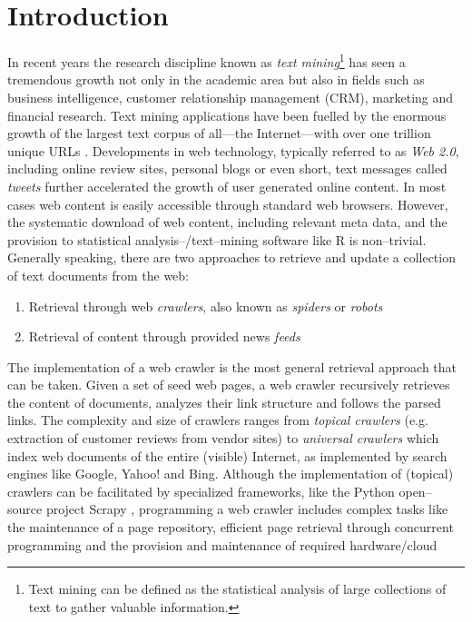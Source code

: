 \documentclass[a4paper]{article}
\newcommand{\pkg}[1]{{\normalfont\fontseries{b}\selectfont #1}}
\newcommand{\proglang}[1]{\textsf{#1}}
\begin{document}
\section{Introduction}
In recent years the research discipline known as \textit{text mining}\footnote{Text
mining can be defined as the statistical analysis of large collections of text
to gather valuable information.} has seen a tremendous growth not only in the
academic area but also in fields such as business intelligence, customer
relationship management (CRM), marketing and financial research. Text mining
applications have been fuelled by the enormous growth of the largest text
corpus of all---the Internet---with over one trillion unique URLs \citep{AlpertHajaj:GoogleBigWeb}.
Developments in web technology, typically referred to as \textit{Web 2.0},
including online review sites, personal blogs or even short, text messages
called \textit{tweets} further accelerated the growth of user generated online
content. In most cases web content is easily accessible through standard web browsers.
However, the systematic download of web content, including relevant
meta data, and the provision to statistical analysis--/text--mining software
like \proglang{R} is non--trivial. Generally speaking, there are two
approaches to retrieve and update a collection of text documents from the web:
\begin{enumerate}
\item Retrieval through web \textit{crawlers}, also known as
\textit{spiders} or \textit{robots}
\item Retrieval of content through provided news \textit{feeds} 
\end{enumerate}
The implementation of a web crawler is the most general retrieval
approach that can be taken. Given a set of seed web pages, a web crawler
recursively retrieves the content of documents, analyzes their link structure
and follows the parsed links. The complexity and size of crawlers ranges from
\textit{topical crawlers} (e.g. extraction of customer reviews from vendor
sites) to \textit{universal crawlers} which index web documents of the entire
(visible) Internet, as implemented by search engines like Google, Yahoo! and
Bing. Although the implementation of (topical) crawlers can be facilitated by
specialized  frameworks, like the \proglang{Python} open--source project
\pkg{Scrapy} \citep{?}, programming a web crawler includes complex tasks like the
maintenance of a page repository, efficient page retrieval through concurrent
programming and the provision and maintenance of required hardware/cloud
\end{document}
